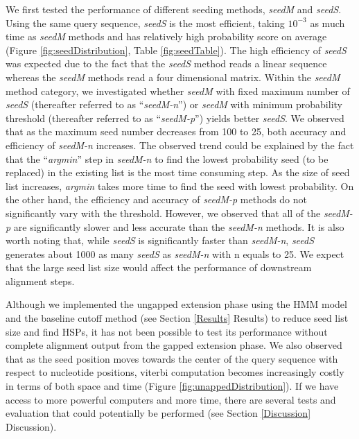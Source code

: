 \documentclass[12pt]{article}
\begin{document}
We first tested the performance of different seeding methods, \textit{seedM} and \textit{seedS}. Using the same query sequence, \textit{seedS} is the most efficient, taking $10^{-3}$ as much time as \textit{seedM} methods and has relatively high probability score on average (Figure \ref{fig:seedDistribution}, Table \ref{fig:seedTable}). The high efficiency of \textit{seedS} was expected due to the fact that the \textit{seedS} method reads a linear sequence whereas the \textit{seedM} methods read a four dimensional matrix. Within the \textit{seedM} method category, we investigated whether \textit{seedM} with fixed maximum number of \textit{seedS} (thereafter referred to as “\textit{seedM-n}”) or \textit{seedM} with minimum probability threshold (thereafter referred to as “\textit{seedM-p}”) yields better \textit{seedS}. We observed that as the maximum seed number decreases from 100 to 25, both accuracy and efficiency of \textit{seedM-n} increases. The observed trend could be explained by the fact that the “\textit{argmin}” step in \textit{seedM-n} to find the lowest probability seed (to be replaced) in the existing list is the most time consuming step.  As the size of seed list increases, \textit{argmin} takes more time to find the seed with lowest probability. On the other hand, the efficiency and accuracy of \textit{seedM-p} methods do not significantly vary with the threshold. However, we observed that all of the \textit{seedM-p} are significantly slower and less accurate than the \textit{seedM-n} methods. It is also worth noting that, while \textit{seedS} is significantly faster than \textit{seedM-n}, \textit{seedS} generates about 1000 as many \textit{seedS} as \textit{seedM-n} with n equals to 25. We expect that the large seed list size would affect the performance of downstream alignment steps. 

Although we implemented the ungapped extension phase using the HMM model and the baseline cutoff method (see Section \ref{Results} Results) to reduce seed list size and find HSPs, it has not been possible to test its performance without complete alignment output from the gapped extension phase. We also observed that as the seed position moves towards the center of the query sequence with respect to nucleotide positions, viterbi computation becomes increasingly costly in terms of both space and time (Figure \ref{fig:unappedDistribution}). If we have access to more powerful computers and more time, there are several tests and evaluation that could potentially be performed (see Section \ref{Discussion} Discussion).
\end{document}
